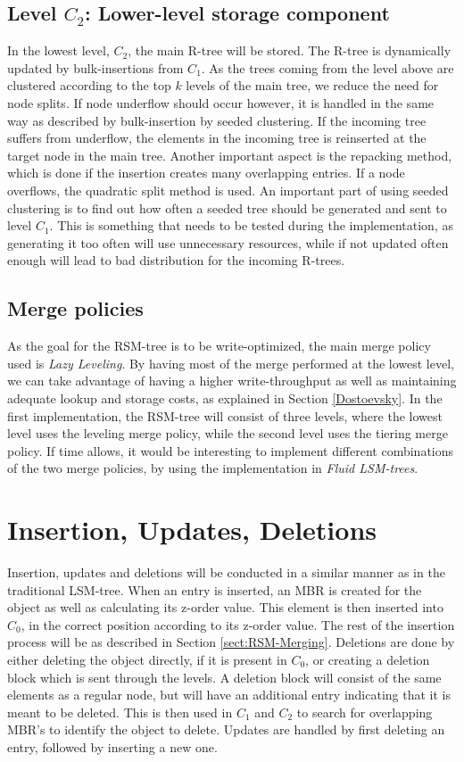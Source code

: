 \subsection{Level $C_2$: Lower-level storage component}
In the lowest level, $C_2$, the main R-tree will be stored. The R-tree is dynamically updated by bulk-insertions from $C_1$. As the trees coming from the level above are clustered according to the top $k$ levels of the main tree, we reduce the need for node splits. If node underflow should occur however, it is handled in the same way as described by bulk-insertion by seeded clustering\cite{SeededClustering}. If the incoming tree suffers from underflow, the elements in the incoming tree is reinserted at the target node in the main tree. Another important aspect is the repacking method, which is done if the insertion creates many overlapping entries. If a node overflows, the quadratic split method\cite{r-tree} is used. An important part of using seeded clustering is to find out how often a seeded tree should be generated and sent to level $C_1$. This is something that needs to be tested during the implementation, as generating it too often will use unnecessary resources, while if not updated often enough will lead to bad distribution for the incoming R-trees. 

\subsection{Merge policies}
As the goal for the RSM-tree is to be write-optimized, the main merge policy used is \emph{Lazy Leveling}\cite{Dostoevsky}. By having most of the merge performed at the lowest level, we can take advantage of having a higher write-throughput as well as maintaining adequate lookup and storage costs, as explained in Section \ref{Dostoevsky}. In the first implementation, the RSM-tree will consist of three levels, where the lowest level uses the leveling merge policy, while the second level uses the tiering merge policy. If time allows, it would be interesting to implement different combinations of the two merge policies, by using the implementation in \emph{Fluid LSM-trees}.  


\section{Insertion, Updates, Deletions}
Insertion, updates and deletions will be conducted in a similar manner as in the traditional LSM-tree. When an entry is inserted, an MBR is created for the object as well as calculating its z-order value. This element is then inserted into $C_0$, in the correct position according to its z-order value. The rest of the insertion process will be as described in Section \ref{sect:RSM-Merging}. Deletions are done by either deleting the object directly, if it is present in $C_0$, or creating a deletion block which is sent through the levels. A deletion block will consist of the same elements as a regular node, but will have an additional entry indicating that it is meant to be deleted. This is then used in $C_1$ and $C_2$ to search for overlapping MBR's to identify the object to delete. Updates are handled by first deleting an entry, followed by inserting a new one. 



